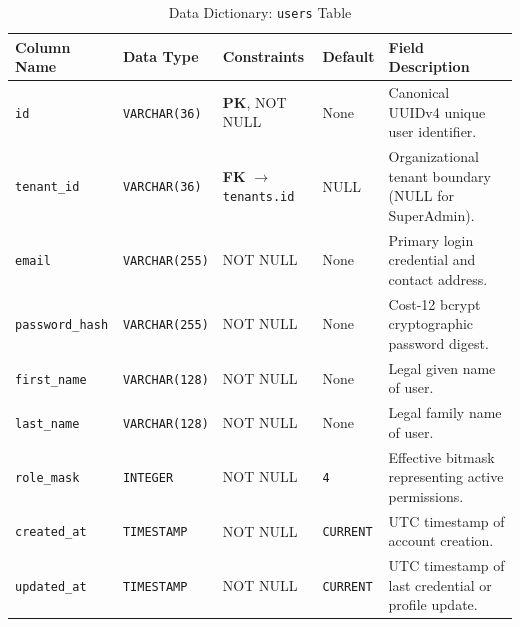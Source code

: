 \begin{table}[htbp]
\centering
\caption{Data Dictionary: \texttt{users} Table}
\label{tab:dict_users}
\small
\begin{tabularx}{\textwidth}{llp{3.2cm}lX}
\toprule
\textbf{Column Name} & \textbf{Data Type} & \textbf{Constraints} & \textbf{Default} & \textbf{Field Description} \\
\midrule
\texttt{id} & \texttt{VARCHAR(36)} & \textbf{PK}, NOT NULL & None & Canonical UUIDv4 unique user identifier. \\
\texttt{tenant\_id} & \texttt{VARCHAR(36)} & \textbf{FK} $\to$ \texttt{tenants.id} & NULL & Organizational tenant boundary (NULL for SuperAdmin). \\
\texttt{email} & \texttt{VARCHAR(255)} & NOT NULL & None & Primary login credential and contact address. \\
\texttt{password\_hash}& \texttt{VARCHAR(255)} & NOT NULL & None & Cost-12 bcrypt cryptographic password digest. \\
\texttt{first\_name} & \texttt{VARCHAR(128)} & NOT NULL & None & Legal given name of user. \\
\texttt{last\_name} & \texttt{VARCHAR(128)} & NOT NULL & None & Legal family name of user. \\
\texttt{role\_mask} & \texttt{INTEGER} & NOT NULL & \texttt{4} & Effective bitmask representing active permissions. \\
\texttt{created\_at} & \texttt{TIMESTAMP} & NOT NULL & \texttt{CURRENT} & UTC timestamp of account creation. \\
\texttt{updated\_at} & \texttt{TIMESTAMP} & NOT NULL & \texttt{CURRENT} & UTC timestamp of last credential or profile update. \\
\bottomrule
\end{tabularx}
\end{table}

